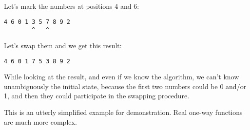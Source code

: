 Let's mark the numbers at positions 4 and 6:

\begin{lstlisting}
4 6 0 1 3 5 7 8 9 2
        ^   ^
\end{lstlisting}

Let's swap them and we get this result:

\begin{lstlisting}
4 6 0 1 7 5 3 8 9 2
\end{lstlisting}

While looking at the result, and even if we know the algorithm, we can't know unambiguously the initial
state, because the first two numbers could be 0 and/or 1, and then they could participate in the swapping procedure.

This is an utterly simplified example for demonstration. Real one-way functions are much more complex.
